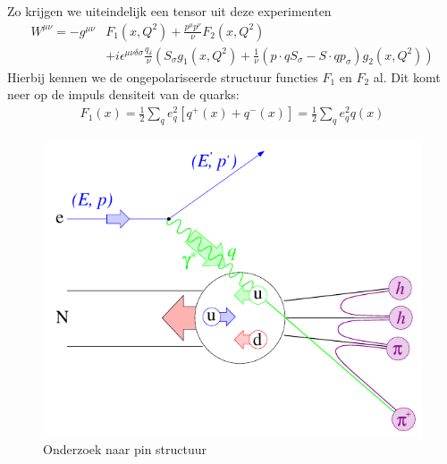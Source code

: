\documentclass[../main.tex]{subfiles}
\begin{document}
Zo krijgen we uiteindelijk een tensor uit deze experimenten
\begin{equation}
    \begin{aligned}
        \label{eq:pol_tensor}
        W^{\mu\nu} = -g^{\mu\nu}&F_1(x,Q^2) + \frac{p^\mu p^\nu}{\nu} F_2(x,Q^2)\\
        &+ i\epsilon^{\mu\nu\delta\sigma} \frac{q_\delta}{\nu} (S_\sigma g_1(x,Q^2) + \frac{1}{\nu} (p\cdot qS_\sigma - S\cdot qp_\sigma)g_2(x,Q^2))
    \end{aligned}
\end{equation}
Hierbij kennen we de ongepolariseerde structuur functies $F_1$ en $F_2$ al. Dit komt neer op de impuls densiteit van de quarks:
\begin{equation}
    \begin{aligned}
        \label{eq:f_1_pol}
        F_1(x)=\frac{1}{2} \sum_q e_q^2[q^+(x)+q^-(x)] = \frac{1}{2} \sum_q e_q^2 q(x)
    \end{aligned}
\end{equation}

\begin{figure}[t!]
    \centering
    \includegraphics[width=0.6\linewidth]{DIS_nucleon_structuur_pdf/foton_abs.png}
    \caption{Onderzoek naar pin structuur}%
    \label{fig:foton_abs}
\end{figure}
\end{document}
